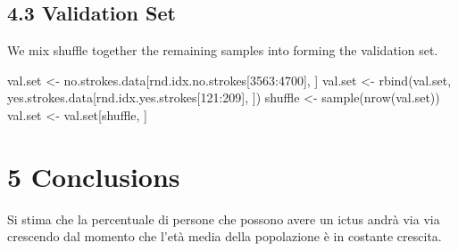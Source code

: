 \documentclass[
]{article}
\newenvironment{Shaded}{\begin{snugshade}}{\end{snugshade}}
\newcommand{\DecValTok}[1]{\textcolor[rgb]{0.00,0.00,0.81}{#1}}
\newcommand{\FunctionTok}[1]{\textcolor[rgb]{0.00,0.00,0.00}{#1}}
\newcommand{\NormalTok}[1]{#1}
\newcommand{\OtherTok}[1]{\textcolor[rgb]{0.56,0.35,0.01}{#1}}
\newcommand{\SpecialCharTok}[1]{\textcolor[rgb]{0.00,0.00,0.00}{#1}}
\begin{document}
\hypertarget{validation-set}{%
\subsection{4.3 Validation Set}\label{validation-set}}

We mix shuffle together the remaining samples into forming the
validation set.

\begin{Shaded}
\begin{Highlighting}[]
\NormalTok{val.set }\OtherTok{\textless{}{-}}\NormalTok{ no.strokes.data[rnd.idx.no.strokes[}\DecValTok{3563}\SpecialCharTok{:}\DecValTok{4700}\NormalTok{], ]}
\NormalTok{val.set }\OtherTok{\textless{}{-}} \FunctionTok{rbind}\NormalTok{(val.set, yes.strokes.data[rnd.idx.yes.strokes[}\DecValTok{121}\SpecialCharTok{:}\DecValTok{209}\NormalTok{], ])}
\NormalTok{shuffle }\OtherTok{\textless{}{-}} \FunctionTok{sample}\NormalTok{(}\FunctionTok{nrow}\NormalTok{(val.set)) }
\NormalTok{val.set }\OtherTok{\textless{}{-}}\NormalTok{ val.set[shuffle, ]}
\end{Highlighting}
\end{Shaded}

\hypertarget{conclusions}{%
\section{5 Conclusions}\label{conclusions}}

Si stima che la percentuale di persone che possono avere un ictus andrà
via via crescendo dal momento che l'età media della popolazione è in
costante crescita.
\end{document}
